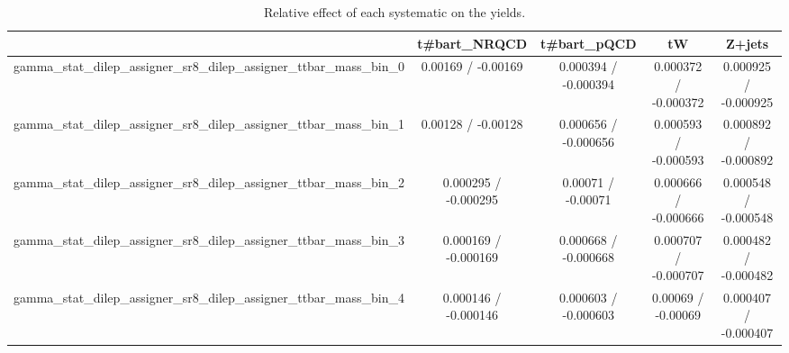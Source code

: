 \documentclass[10pt]{article}
\begin{document}
\begin{table}[htbp]
\begin{center}
\begin{tabular}{|c|c|c|c|c|}
\hline 
      & t#bar{t}_{NRQCD}      & t#bar{t}_{pQCD}      & tW      & Z+jets \\ 
\hline 
  gamma_stat_dilep_assigner_sr8_dilep_assigner_ttbar_mass_bin_0 & 0.00169 / -0.00169 & 0.000394 / -0.000394 & 0.000372 / -0.000372 & 0.000925 / -0.000925 \\ 
  gamma_stat_dilep_assigner_sr8_dilep_assigner_ttbar_mass_bin_1 & 0.00128 / -0.00128 & 0.000656 / -0.000656 & 0.000593 / -0.000593 & 0.000892 / -0.000892 \\ 
  gamma_stat_dilep_assigner_sr8_dilep_assigner_ttbar_mass_bin_2 & 0.000295 / -0.000295 & 0.00071 / -0.00071 & 0.000666 / -0.000666 & 0.000548 / -0.000548 \\ 
  gamma_stat_dilep_assigner_sr8_dilep_assigner_ttbar_mass_bin_3 & 0.000169 / -0.000169 & 0.000668 / -0.000668 & 0.000707 / -0.000707 & 0.000482 / -0.000482 \\ 
  gamma_stat_dilep_assigner_sr8_dilep_assigner_ttbar_mass_bin_4 & 0.000146 / -0.000146 & 0.000603 / -0.000603 & 0.00069 / -0.00069 & 0.000407 / -0.000407 \\ 
\hline 
\end{tabular} 
\caption{Relative effect of each systematic on the yields.} 
\end{center} 
\end{table} 
\end{document}
